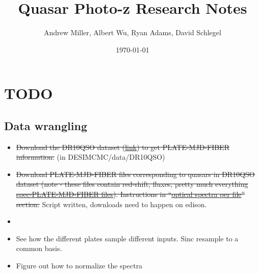 \documentclass[11pt]{article}
\title{Quasar Photo-z Research Notes}
\author{Andrew Miller, Albert Wu, Ryan Adams, David Schlegel}
\date{\today}
\begin{document}
\maketitle
\begin{abstract}
\end{abstract}


\section{TODO}

\subsection{Data wrangling} 
\begin{itemize} \itemsep 0pt
\item \sout{ Download the DR10QSO dataset (\href{http://data.sdss3.org/datamodel/files/BOSS_QSO/DR10Q/DR10Q.html}{link}) to get PLATE-MJD-FIBER information. } (in DESIMCMC/data/DR10QSO)
\item \sout{ Download PLATE-MJD-FIBER files corresponding to quasars in DR10QSO dataset (note - these files contain red-shift, fluxes, pretty much everything \href{http://data.sdss3.org/datamodel/files/BOSS_SPECTRO_REDUX/RUN2D/spectra/PLATE4/spec.html}{spec-PLATE-MJD-FIBER files}).  Instructions in ``\href{https://www.sdss3.org/dr10/data_access/bulk.php}{optical spectra per file}'' section. } Script written, downloads need to happen on edison.  
\item 
\item See how the different plates sample different inputs.  Sinc resample to a common basis.  
\item Figure out how to normalize the spectra  
\end{itemize}
\end{document}

